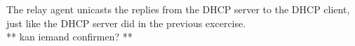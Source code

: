 The relay agent unicasts the replies from the DHCP server to the DHCP client, just like the DHCP server did in the previous excercise. \\
** kan iemand confirmen? **
